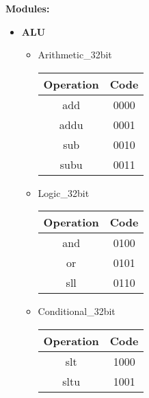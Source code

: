 \documentclass[11pt]{article}   	%
\begin{document}
\Large
\textbf{Modules:}
\normalsize

\begin{itemize}
\item
\textbf{ALU}


\begin{itemize}
\item
Arithmetic\_32bit

\begin{table}[htbp!]
\centering
\begin{tabular}{|c|c|}
\hline
Operation & Code \\
\hline
add & 0000 \\
\hline
addu & 0001 \\
\hline
sub & 0010 \\
\hline
subu & 0011\\
\hline
\end{tabular}
\end{table}




\item
Logic\_32bit

\begin{table}[htbp!]
\centering
\begin{tabular}{|c|c|}
\hline
Operation & Code \\
\hline
and & 0100 \\
\hline
or &0101 \\
\hline
sll & 0110\\
\hline
\end{tabular}
\end{table}




\item
Conditional\_32bit

\begin{table}[htbp!]
\centering
\begin{tabular}{|c|c|}
\hline
Operation & Code \\
\hline
slt & 1000 \\
\hline
sltu & 1001 \\
\hline
\end{tabular}
\end{table}

\end{itemize}

\end{itemize}
\end{document}
